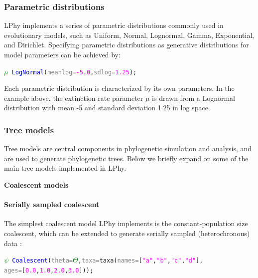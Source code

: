 \documentclass[10pt,letterpaper,table]{article}
\begin{document}
\subsubsection{Parametric distributions}
LPhy implements a series of parametric distributions commonly used in evolutionary models, such as Uniform, Normal, Lognormal, Gamma, Exponential, and Dirichlet. 
Specifying parametric distributions as generative distributions for model parameters can be achieved by:


{\small
\begin{alltt}
    \textcolor{green}{\(\mu\)} ~ \textcolor{blue}{LogNormal}(\textcolor{gray}{meanlog=}\textcolor{magenta}{-5.0}, \textcolor{gray}{sdlog=}\textcolor{magenta}{1.25});
\end{alltt}}

Each parametric distribution is characterized by its own parameters. 
In the example above, the extinction rate parameter $\mu$ is drawn from a Lognormal distribution with mean -5 and standard deviation 1.25 in log space.

\subsubsection{Tree models}
\label{sec:treeprior}
Tree models are central components in phylogenetic simulation and analysis, and are used to generate phylogenetic trees. Below we briefly expand on some of the main tree models implemented in LPhy.
\newline

\noindent \textbf{Coalescent models}
\paragraph{Serially sampled coalescent}
The simplest coalescent model LPhy implements is the constant-population size coalescent, which can be extended to generate serially sampled (heterochronous) data \cite{Rodrigo1999SerialCoalescent}:
{\small
  \begin{alltt}
    \textcolor{green}{\(\psi\)} ~ \textcolor{blue}{Coalescent}(\textcolor{gray}{theta=}\textcolor{green}{\(\Theta\)}, \textcolor{gray}{taxa=}\textcolor{magenta!80!black}{taxa}(\textcolor{gray}{names=}[\textcolor{magenta}{"a"}, \textcolor{magenta}{"b"}, \textcolor{magenta}{"c"}, \textcolor{magenta}{"d"}], 
      \textcolor{gray}{ages=}[\textcolor{magenta}{0.0}, \textcolor{magenta}{1.0}, \textcolor{magenta}{2.0}, \textcolor{magenta}{3.0}]));
  \end{alltt}
}
\end{document}
